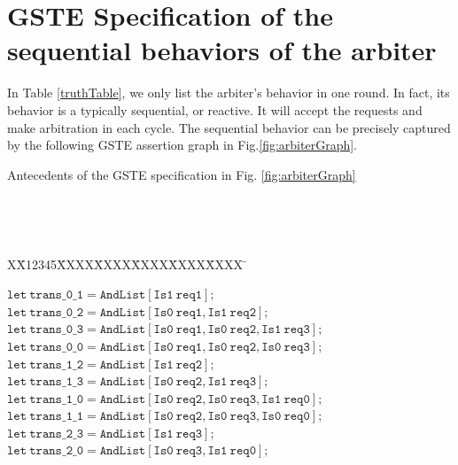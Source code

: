 \documentclass[final]{IEEEtran}
\newlength{\fminilength}
\newenvironment{fmini}[1][\linewidth]
  {\setlength{\fminilength}{#1\fboxsep-2\fboxrule}%
   \vspace{2ex}\noindent\begin{lrbox}{\fminibox}\begin{minipage}{\fminilength}%
   \mbox{ }\hfill\vspace{-2.5ex}}%
  {\end{minipage}\end{lrbox}\vspace{1ex}\hspace{0ex}%
   \framebox{\usebox{\fminibox}}}
\newenvironment{specification}
{\noindent\footnotesize\tt\begin{fmini}\begin{tabbing}X\=X12345\=XXXX\=XXXX\=XXXX\=XXXX\=XXXX
\=\+\kill} {\end{tabbing}\normalfont\end{fmini}}
\begin{document}
\section{GSTE Specification of the sequential behaviors of the arbiter}
\label{sec:GSTE}
 In Table \ref{truthTable}, we only list the arbiter's
behavior in one round. In fact, its behavior is a typically
sequential, or reactive. It will accept the requests and make
arbitration in each cycle.  The sequential behavior can be precisely
captured by the following GSTE assertion graph in
Fig.\ref{fig:arbiterGraph}.
\begin{center}
\begin{table}
\caption{Antecedents of the GSTE specification in Fig.
\ref{fig:arbiterGraph}}
\begin{specification}



$\mathtt{let\ trans\_0\_1 = AndList [Is1 \
req1 ];}$\\

$\mathtt{let\ trans\_0\_2 = AndList [Is0 \ req1 , Is1 \
req2 ];}$\\

$\mathtt{let\ trans\_0\_3 = AndList [Is0 \ req1 , Is0 \ req2 , Is1 \
req3 ];}$\\

$\mathtt{let\ trans\_0\_0 = AndList [Is0 \ req1 , Is0 \ req2 , Is0 \
req3 ];}$\\

$\mathtt{let\ trans\_1\_2 = AndList [Is1 \ req2 ];}$\\

$\mathtt{let\ trans\_1\_3 = AndList [Is0 \ req2 , Is1 \
req3 ];}$\\

$\mathtt{let\ trans\_1\_0 = AndList [Is0 \ req2 , Is0 \ req3 , Is1 \
req0 ];}$\\

$\mathtt{let\ trans\_1\_1 = AndList [Is0 \ req2 , Is0 \ req3 , Is0 \
req0 ];}$\\

$\mathtt{let\ trans\_2\_3 = AndList [Is1 \ req3 ];}$\\

$\mathtt{let\ trans\_2\_0 = AndList [Is0 \ req3 , Is1 \
req0 ];}$\\


\end{specification}
\end{table}
\end{center}
\end{document}
